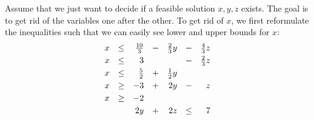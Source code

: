 \documentclass[12pt, showidx, twoside]{article}
\begin{document}
{{{{Assume that we just want to decide if a feasible solution $x,y,z$ exists. 
The goal is to get rid of the variables one after the other.
To get rid of $x$, we first reformulate the inequalities such that we can
easily see lower and upper bounds for $x$:
\begin{equation}\label{eq::FM2}
\begin{array}{rrrrrrr}
x & \leq & \frac{10}{3} & - & \frac{2}{3}y &  - & \frac{4}{3}z\vspace*{1mm}\\
x & \leq &            3 &   &              &  - & \frac{2}{3}z\vspace*{1mm}\\
x & \leq & \frac{5}{2}  & + & \frac{1}{2}y &    &             \vspace*{1mm}\\
x & \geq &           -3 & + &           2y &  - &            z\vspace*{1mm}\\
x & \geq &           -2 &   &              &    &             \vspace*{1mm}\\
    &   & 2y & + & 2z & \leq & 7
\end{array}
\end{equation}

}}}}
\end{document}
